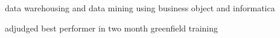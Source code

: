 \begin{minipage}[t]{0.675\textwidth}

\begin{tightitemize}
\item data warehousing and data mining using business object and informatica
\item adjudged best performer in two month greenfield training 
\end{tightitemize}


\end{minipage} %
\vspace*{\fill}
\center{\textcolor{gray}{2/2}}
